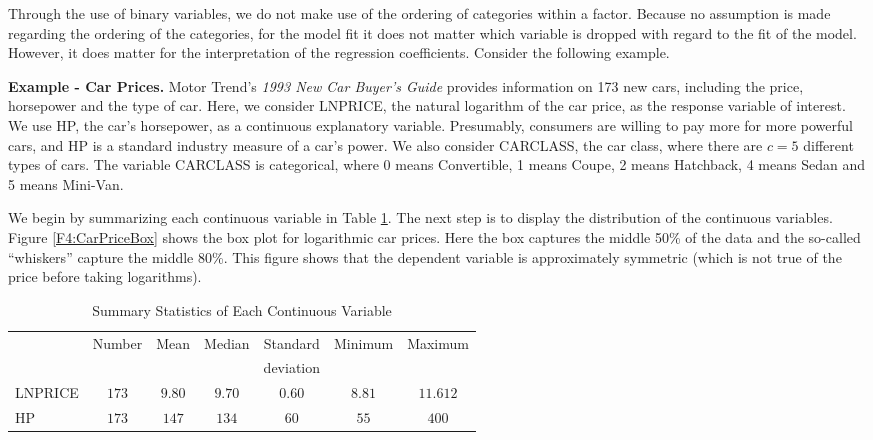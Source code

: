 Through the use of binary variables, we do not make use of the
ordering of categories within a factor. Because no assumption is
made regarding the ordering of the categories, for the model fit it
does not matter which variable is dropped with regard to the fit of
the model. However, it does matter for the interpretation of the
regression coefficients. Consider the following example.

\linejed

\bigskip

\textbf{Example - Car Prices.} Motor Trend's \textit{1993 New Car
Buyer's Guide} provides information on 173 new cars, including the
price, horsepower and the type of car. Here, we consider LNPRICE,
the natural logarithm of the car price, as the response variable of
interest. We use HP, the car's horsepower, as a continuous
explanatory variable. Presumably, consumers are willing to pay more
for more powerful cars, and HP is a standard industry measure of a
car's power. We also consider CARCLASS, the car class, where there
are $c=5$ different types of cars. The variable CARCLASS is
categorical, where 0 means Convertible, 1 means Coupe, 2 means
Hatchback, 4 means Sedan and 5 means Mini-Van.

We begin by summarizing each continuous variable in Table
\ref{T4:SumStatsCarPrice}. The next step is to display the
distribution of the continuous variables. Figure
\ref{F4:CarPriceBox} shows the box plot for logarithmic car prices.
Here the box captures the middle 50\% of the data and the so-called
``whiskers'' capture the middle 80\%. This figure shows that the
dependent variable is approximately symmetric (which is not true of
the price before taking logarithms).

  \begin{center}  \begin{table}[h]
\caption{\label{T4:SumStatsCarPrice} Summary Statistics of Each
Continuous Variable}
\begin{tabular}{lcccccc}
\hline
& Number & Mean & Median & Standard & Minimum & Maximum \\
&  &  &  & deviation &  &  \\ \hline
LNPRICE & $173$ & $9.80$ & $9.70$ & $0.60$ & $8.81$ & $11.612$ \\
HP & $173$ & $147$ & $134$ & $60$ & $55$ & $400$ \\ \hline
\end{tabular}

\end{table}  \end{center}  



